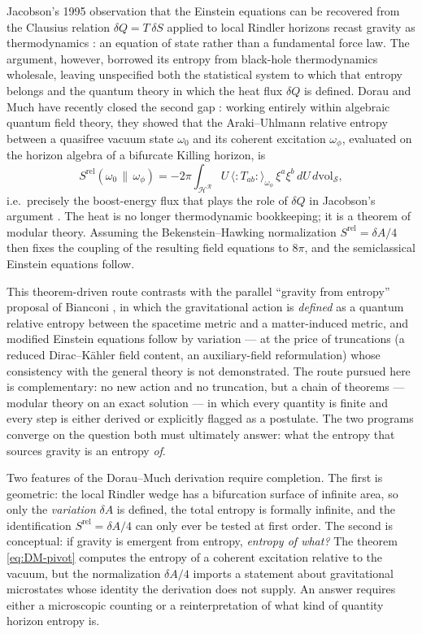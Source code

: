 \documentclass[11pt]{article}
\newcommand{\Srel}{S^{\mathrm{rel}}}
\begin{document}
Jacobson's 1995 observation that the Einstein equations can be recovered from the Clausius relation $\delta Q = T\,\delta S$ applied to local Rindler horizons recast gravity as thermodynamics \cite{Jacobson}: an equation of state rather than a fundamental force law. The argument, however, borrowed its entropy from black-hole thermodynamics wholesale, leaving unspecified both the statistical system to which that entropy belongs and the quantum theory in which the heat flux $\delta Q$ is defined. Dorau and Much have recently closed the second gap \cite{DorauMuch}: working entirely within algebraic quantum field theory, they showed that the Araki--Uhlmann relative entropy between a quasifree vacuum state $\omega_0$ and its coherent excitation $\omega_\phi$, evaluated on the horizon algebra of a bifurcate Killing horizon, is
\begin{equation}
\Srel(\omega_0 \,\|\, \omega_\phi)
= -2\pi \int_{\mathcal{H}^{\mathcal{R}}} U \,\langle{:}T_{ab}{:}\rangle_{\omega_\phi}\, \xi^a \xi^b \, dU\, d\mathrm{vol}_{\mathcal{S}},
\label{eq:DM-pivot}
\end{equation}
i.e.\ precisely the boost-energy flux that plays the role of $\delta Q$ in Jacobson's argument \cite{Jacobson}. The heat is no longer thermodynamic bookkeeping; it is a theorem of modular theory. Assuming the Bekenstein--Hawking normalization $\Srel = \delta A/4$ then fixes the coupling of the resulting field equations to $8\pi$, and the semiclassical Einstein equations follow.

This theorem-driven route contrasts with the parallel ``gravity from entropy'' proposal of Bianconi \cite{Bianconi2025,Bianconi2026}, in which the gravitational action is \emph{defined} as a quantum relative entropy between the spacetime metric and a matter-induced metric, and modified Einstein equations follow by variation --- at the price of truncations (a reduced Dirac--K\"ahler field content, an auxiliary-field reformulation) whose consistency with the general theory is not demonstrated. The route pursued here is complementary: no new action and no truncation, but a chain of theorems --- modular theory on an exact solution --- in which every quantity is finite and every step is either derived or explicitly flagged as a postulate. The two programs converge on the question both must ultimately answer: what the entropy that sources gravity is an entropy \emph{of}.

Two features of the Dorau--Much derivation \cite{DorauMuch} require completion. The first is geometric: the local Rindler wedge has a bifurcation surface of infinite area, so only the \emph{variation} $\delta A$ is defined, the total entropy is formally infinite, and the identification $\Srel = \delta A/4$ can only ever be tested at first order. The second is conceptual: if gravity is emergent from entropy, \emph{entropy of what?} The theorem \eqref{eq:DM-pivot} computes the entropy of a coherent excitation relative to the vacuum, but the normalization $\delta A/4$ imports a statement about gravitational microstates whose identity the derivation does not supply. An answer requires either a microscopic counting or a reinterpretation of what kind of quantity horizon entropy is.
\end{document}

